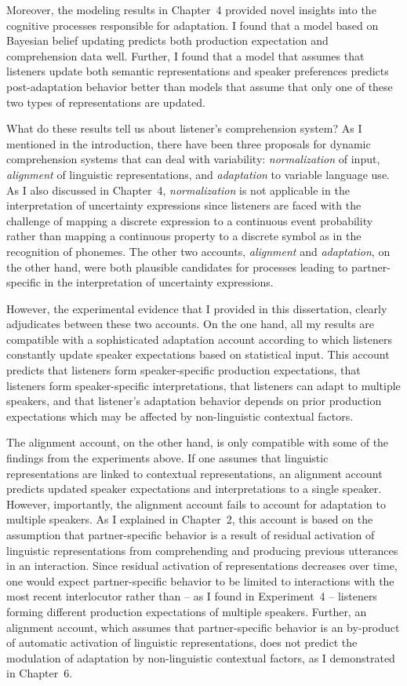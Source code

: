 Moreover, the modeling results in Chapter~4 provided novel insights into the cognitive processes responsible for adaptation. I found that a model based on Bayesian belief updating predicts both production expectation and comprehension data well. Further, I found that a model that assumes that listeners update both semantic representations and speaker preferences predicts post-adaptation behavior better than models that assume that only one of these two types of representations are updated.

What do these results tell us about listener's comprehension system? As I mentioned in the introduction, there have been three proposals for dynamic comprehension systems that can deal with variability: \textit{normalization} of input, \textit{alignment} of linguistic representations, and \textit{adaptation} to variable language use. As I also discussed in Chapter~4, \textit{normalization} is not applicable in the interpretation of uncertainty expressions since listeners are faced with the challenge of mapping a discrete expression to a continuous event probability rather than mapping a continuous property to a discrete symbol as in the recognition of phonemes. The other two accounts, \textit{alignment} and \textit{adaptation}, on the other hand, were both plausible candidates for processes leading to partner-specific in the interpretation of uncertainty expressions.

However, the experimental evidence that I provided in this dissertation, clearly adjudicates between these two accounts. On the one hand, all my results are compatible with a sophisticated adaptation account according to which listeners constantly update speaker expectations based on statistical input. This account predicts that listeners form speaker-specific production expectations, that listeners form speaker-specific interpretations, that listeners can adapt to multiple speakers, and that listener's adaptation behavior depends on prior production expectations which may be affected by non-linguistic contextual factors.

The alignment account, on the other hand, is only compatible with some of the findings from the experiments above. If one assumes that linguistic representations are linked to contextual representations, an alignment account predicts updated speaker expectations and interpretations to a single speaker. However, importantly, the alignment account fails to account for adaptation to multiple speakers. As I explained in Chapter~2, this account is based on the assumption that partner-specific behavior is a result of residual activation of linguistic representations from comprehending and producing previous utterances in an interaction. Since residual activation  of representations decreases over time, one would expect partner-specific behavior to be limited to interactions with the most recent interlocutor rather than -- as I found in Experiment~4 -- listeners forming different production expectations of multiple speakers. Further, an alignment account, which assumes that partner-specific behavior is an by-product of automatic activation of linguistic representations, does not predict the modulation of adaptation by non-linguistic contextual factors, as I demonstrated in Chapter~6. 

